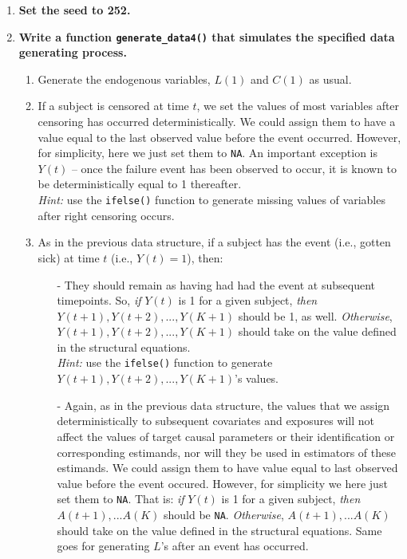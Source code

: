 \documentclass{exam}
\begin{document}
\begin{enumerate}
\item \textbf{Set the seed to 252.}
\item \textbf{Write a function \texttt{generate\_data4()} that simulates the specified data generating process.}
\begin{enumerate}
\item Generate the endogenous variables, $L(1)$ and $C(1)$ as usual. \\
\item If a subject is censored at time $t$, we set the values of most variables after censoring has occurred deterministically. We could assign them to have a value equal to the last observed value before the event occurred. However, for simplicity, here we just set them to \texttt{NA}. An important exception is $Y(t)$ -- once the failure event has been observed to occur, it is known to be deterministically equal to 1 thereafter. \\
\emph{Hint:} use the \texttt{ifelse()} function to generate missing values of variables after right censoring occurs. 
\item As in the previous data structure, if a subject has the event (i.e., gotten sick) at time $t$ (i.e., $Y(t) = 1$), then:
\begin{itemize}
\item[-] They should remain as having had had the event at subsequent timepoints. So, \textit{if} $Y(t)$ is 1 for a given subject, \textit{then} $Y(t+1), Y(t+2), ... , Y(K+1)$ should be 1, as well. \textit{Otherwise}, $Y(t+1), Y(t+2), ... , Y(K+1)$ should take on the value defined in the structural equations. \\
\emph{Hint:} use the \texttt{ifelse()} function to generate $Y(t+1), Y(t+2), ... , Y(K+1)$'s values.
\item[-] Again, as in the previous data structure, the values that we assign deterministically to subsequent covariates and exposures  will not affect the values of target causal parameters or their identification or corresponding estimands, nor will they be used in estimators of these estimands. We could assign them to have value equal to last observed value before the event occured. However, for simplicity we here just set them to \texttt{NA}. That is: \textit{if} $Y(t)$ is 1 for a given subject,  \textit{then} $A(t+1), ... A(K)$ should be \texttt{NA}. \textit{Otherwise}, $A(t+1), ... A(K)$ should take on the value defined in the structural equations. Same goes for generating $L$'s after an event has occurred. \\

\end{itemize}
\end{enumerate}
\end{enumerate}
\end{document}
